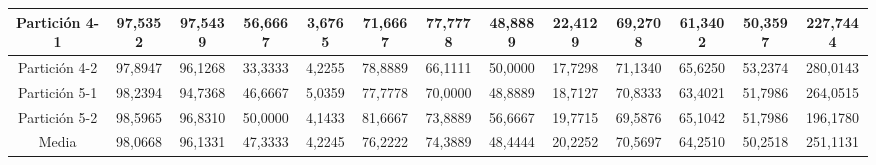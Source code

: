 \documentclass[12pt]{article}
\begin{document}
\begin{table}[H]
{\begin{tabular}{|c|cccc|cccc|cccc|}
Partición 4-1 & \multicolumn{1}{c|}{97,5352}                                                  & \multicolumn{1}{c|}{97,5439}                                                 & \multicolumn{1}{c|}{56,6667} & 3,6765 & \multicolumn{1}{c|}{71,6667}                                                  & \multicolumn{1}{c|}{77,7778}       & \multicolumn{1}{c|}{48,8889} & 22,4129 & \multicolumn{1}{c|}{69,2708}                                                  & \multicolumn{1}{c|}{61,3402}                                                 & \multicolumn{1}{c|}{50,3597} & 227,7444 \\ \hline
Partición 4-2 & \multicolumn{1}{c|}{97,8947}                                                  & \multicolumn{1}{c|}{96,1268}                                                 & \multicolumn{1}{c|}{33,3333} & 4,2255 & \multicolumn{1}{c|}{78,8889}                                                  & \multicolumn{1}{c|}{66,1111}       & \multicolumn{1}{c|}{50,0000} & 17,7298 & \multicolumn{1}{c|}{71,1340}                                                  & \multicolumn{1}{c|}{65,6250}                                                 & \multicolumn{1}{c|}{53,2374} & 280,0143 \\ \hline
Partición 5-1 & \multicolumn{1}{c|}{98,2394}                                                  & \multicolumn{1}{c|}{94,7368}                                                 & \multicolumn{1}{c|}{46,6667} & 5,0359 & \multicolumn{1}{c|}{77,7778}                                                  & \multicolumn{1}{c|}{70,0000}       & \multicolumn{1}{c|}{48,8889} & 18,7127 & \multicolumn{1}{c|}{70,8333}                                                  & \multicolumn{1}{c|}{63,4021}                                                 & \multicolumn{1}{c|}{51,7986} & 264,0515 \\ \hline
Partición 5-2 & \multicolumn{1}{c|}{98,5965}                                                  & \multicolumn{1}{c|}{96,8310}                                                 & \multicolumn{1}{c|}{50,0000} & 4,1433 & \multicolumn{1}{c|}{81,6667}                                                  & \multicolumn{1}{c|}{73,8889}       & \multicolumn{1}{c|}{56,6667} & 19,7715 & \multicolumn{1}{c|}{69,5876}                                                  & \multicolumn{1}{c|}{65,1042}                                                 & \multicolumn{1}{c|}{51,7986} & 196,1780 \\ \hline
Media         & \multicolumn{1}{c|}{98,0668}                                                  & \multicolumn{1}{c|}{96,1331}                                                 & \multicolumn{1}{c|}{47,3333} & 4,2245 & \multicolumn{1}{c|}{76,2222}                                                  & \multicolumn{1}{c|}{74,3889}       & \multicolumn{1}{c|}{48,4444} & 20,2252 & \multicolumn{1}{c|}{70,5697}                                                  & \multicolumn{1}{c|}{64,2510}                                                 & \multicolumn{1}{c|}{50,2518} & 251,1131 \\ \hline
\end{tabular}}
\end{table}
\end{document}
